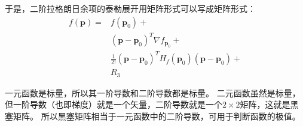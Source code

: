 于是，二阶拉格朗日余项的泰勒展开用矩阵形式可以写成矩阵形式：
\begin{align*}
f\left( \boldsymbol{p} \right) =&f\left( \boldsymbol{p}_0 \right) + \\
&\left( \boldsymbol{p}-\boldsymbol{p}_0 \right) ^T\nabla f_{\boldsymbol{p}_0}+ \\
&\frac{1}{2!}\left( \boldsymbol{p}-\boldsymbol{p}_0 \right) ^TH_f\left( \boldsymbol{p}_0 \right) \left( \boldsymbol{p}-\boldsymbol{p}_0 \right) + \\
&R_3
\end{align*}

一元函数是标量，所以其一阶导数和二阶导数都是标量。
二元函数虽然是标量，但一阶导数（也即梯度）就是一个矢量，二阶导数就是一个$2\times 2$矩阵，这就是黑塞矩阵。
所以黑塞矩阵相当于一元函数中的二阶导数，可用于判断函数的极值。




